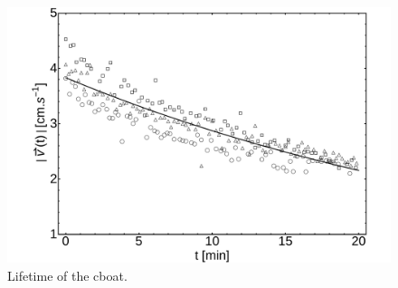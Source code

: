 \documentclass[journal=langd5, manuscript=article, layout=twocolumn]{achemso}
\begin{document}
\begin{figure}[ht]
    \begin{center}
       \includegraphics[scale=0.25]{lifetime.pdf}
    \end{center}
    \caption{Lifetime of the cboat.}
    \label{fig:lifetime}
\end{figure}
\end{document}

